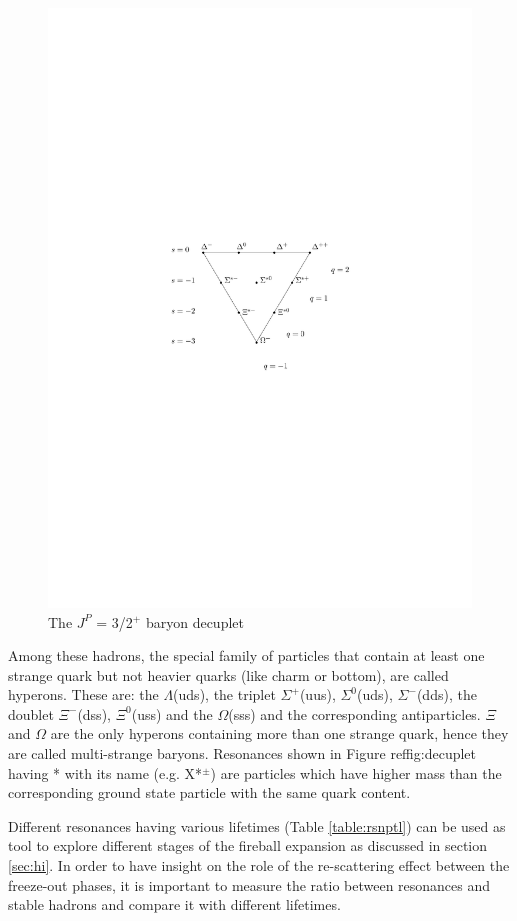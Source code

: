 \begin{figure}[htbp]
\begin{center}
\includegraphics[width=10.cm]{./Version1/FigChapter3/Decuplet}
\caption{ The $J^{P}$ = 3/2$^{+}$ baryon decuplet}
\label{fig:decuplet}
\end{center}
\end{figure}

Among these hadrons, the special family of particles that contain at least one strange quark but not heavier quarks (like charm or bottom), are called hyperons. These are: the $\Lambda$(uds), the triplet $\Sigma^{+}$(uus), $\Sigma^{0}$(uds), $\Sigma^{-}$(dds), the doublet $\Xi^{-}$(dss), $\Xi^{0}$(uss) and the $\Omega$(sss) and the corresponding antiparticles. $\Xi$ and $\Omega$ are the only hyperons containing more than one strange quark, hence they are called multi-strange baryons. 
Resonances shown in Figure ref{fig:decuplet} having * with its name (e.g. X*$^{\pm}$) are particles which have higher mass than the corresponding ground state particle with the same quark content. 

Different resonances having various lifetimes (Table \ref{table:rsnptl}) can be used as tool to explore different stages of the fireball expansion as discussed in section \ref{sec:hi}. In order to have insight on the role of the re-scattering effect between the freeze-out phases, it is important to measure the ratio between resonances and stable hadrons and  compare it with different lifetimes. 


